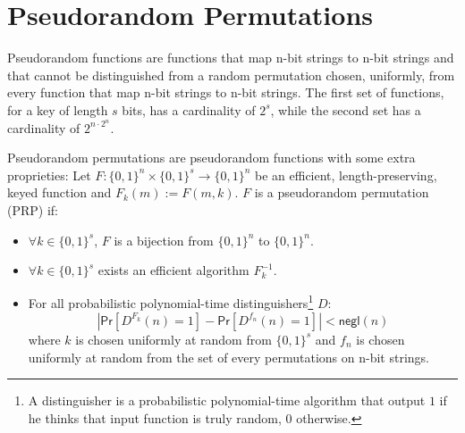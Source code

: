 \section{Pseudorandom Permutations}
Pseudorandom functions are functions that map n-bit strings to n-bit strings and that cannot be distinguished from a random permutation chosen, uniformly, from every function that map n-bit strings to n-bit strings.
The first set of functions, for a key of length $s$ bits, has a cardinality of $2^{s}$, while the second set has a cardinality of $2^{n\cdot2^n}$.\par
Pseudorandom permutations are pseudorandom functions with some extra proprieties:
Let $F : \{0,1\}^{n} \times \{0,1\}^{s} \rightarrow \{0,1\}^{n}$ be an efficient, length-preserving, keyed function and $F_k(m) := F(m, k)$.
$F$ is a pseudorandom permutation (PRP) if:
\begin{itemize}
    \item{$\forall k \in \{0,1\}^{s}$, $F$ is a bijection from $\{0,1\}^{n}$ to $\{0,1\}^{n}$}.
    \item{$\forall k \in \{0,1\}^{s}$ exists an efficient algorithm $F^{-1}_k$.}
    \item{For all probabilistic polynomial-time distinguishers\footnote{A distinguisher is a probabilistic polynomial-time algorithm that output $1$ if he thinks that input function is truly random, $0$ otherwise.} $D$:
        $$
            |\mathsf{Pr}[D^{F_k}(n) = 1] - \mathsf{Pr}[D^{f_n}(n) = 1]| < \mathsf{negl}(n)
        $$
        where $k$ is chosen uniformly at random from $\{0,1\}^{s}$ and $f_n$ is chosen uniformly at random from the set of every permutations on n-bit strings.
        }
\end{itemize}

